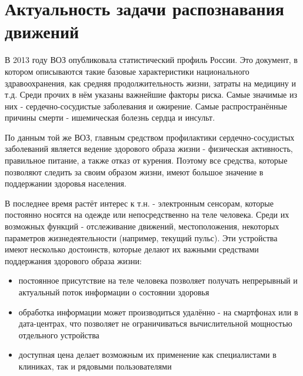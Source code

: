 \chapter{Актуальность задачи распознавания движений}

В 2013 году ВОЗ опубликовала статистический профиль России. Это документ, в котором описываются такие базовые характеристики национального здравоохранения, как средняя продолжительность жизни, затраты на медицину и т.д. Среди прочих в нём указаны важнейшие факторы риска. Самые значимые из них - сердечно-сосудистые заболевания и ожирение. Самые распространённые причины смерти - ишемическая болезнь сердца и инсульт. 

По данным той же ВОЗ, главным средством профилактики сердечно-сосудистых заболеваний является ведение здорового образа жизни - физическая активность, правильное питание, а также отказ от курения. Поэтому все средства, которые позволяют следить за своим образом жизни, имеют большое значение в поддержании здоровья населения.

В последнее время растёт интерес к т.н.  - электронным сенсорам, которые постоянно носятся на одежде или непосредственно на теле человека. Среди их возможных функций - отслеживание движений, местоположения, некоторых параметров жизнедеятельности (например, текущий пульс). Эти устройства имеют несколько достоинств, которые делают их важными средствами поддержания здорового образа жизни:
\begin{itemize}
\item постоянное присутствие на теле человека позволяет получать непрерывный и актуальный поток информации о состоянии здоровья
\item обработка информации может производиться удалённо - на смартфонах или в дата-центрах, что позволяет не ограничиваться вычислительной мощностью отдельного устройства
\item доступная цена делает возможным их применение как специалистами в клиниках, так и рядовыми пользователями
\end{itemize}

